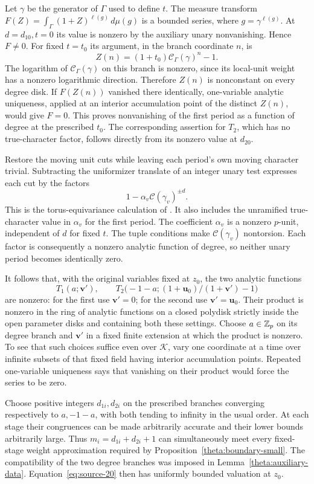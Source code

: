Let $\gamma$ be the generator of $\Gamma$ used to define $t$.
The measure transform
$F(Z)=\int_\Gamma(1+Z)^{\ell(g)}\,d\mu(g)$ is a bounded series,
where $g=\gamma^{\ell(g)}$.  At $d=d_{10},t=0$ its value is
nonzero by the auxiliary unary nonvanishing.  Hence $F\ne0$.
For fixed $t=t_0$ its argument, in the branch coordinate $n$, is
\[
                    Z(n)=(1+t_0)\mathcal C_\Gamma(\gamma)^n-1.
\]
The logarithm of $\mathcal C_\Gamma(\gamma)$ on this branch
is nonzero, since its local-unit weight has a nonzero logarithmic
direction.  Therefore $Z(n)$ is nonconstant on every degree disk.
If $F(Z(n))$ vanished there identically, one-variable analytic
uniqueness, applied at an interior accumulation point of the
distinct $Z(n)$, would give $F=0$.  This proves nonvanishing of the
first period as a function of degree at the prescribed $t_0$.
The corresponding assertion for $T_2$, which has no true-character
factor, follows directly from its nonzero value at $d_{20}$.

Restore the moving unit cuts while leaving each period's own
moving character trivial.  Subtracting the uniformizer translate
of an integer unary test expresses each cut by the factors
\[
                  1-\alpha_v\mathcal C(\gamma_v)^{\pm d}.
\]
This is the torus-equivariance calculation of \cite[equation~(6.7)]{C}.
It also includes
the unramified true-character value in $\alpha_v$ for the first
period.  The coefficient $\alpha_v$ is a nonzero $p$-unit,
independent of $d$ for fixed $t$.  The tuple conditions make
$\mathcal C(\gamma_v)$ nontorsion.  Each factor is consequently
a nonzero analytic function of degree, so neither unary period
becomes identically zero.

It follows that, with the original variables fixed at $z_0$, the
two analytic functions
\[
 T_1(a;\mathbf v'),\qquad
 T_2\bigl(-1-a;(1+\mathbf u_0)/(1+\mathbf v')-1\bigr)
\]
are nonzero: for the first use $\mathbf v'=0$; for the second
use $\mathbf v'=\mathbf u_0$.  Their product is nonzero in the
ring of analytic functions on a closed polydisk strictly inside
the open parameter disks and containing both these settings.
Choose $a\in\mathbb Z_p$ on its degree branch and $\mathbf v'$ in a
fixed finite extension at which the product is nonzero.  To see
that such choices suffice even over $\mathcal K$, vary one
coordinate at a time over infinite subsets of that fixed field
having interior accumulation points.  Repeated one-variable
uniqueness says that vanishing on their product would force the
series to be zero.

Choose positive integers $d_{1i},d_{2i}$ on the prescribed branches
converging respectively to $a,-1-a$, with both tending to infinity
in the usual order.  At each stage their congruences can be made
arbitrarily accurate and their lower bounds arbitrarily large.
Thus $m_i=d_{1i}+d_{2i}+1$ can simultaneously meet every fixed-stage
weight approximation required by Proposition~\ref{theta:boundary-small}.
The compatibility of the two degree branches was imposed in
Lemma~\ref{theta:auxiliary-data}.  Equation~\eqref{eq:source-20}
then has uniformly bounded valuation at $z_0$.

